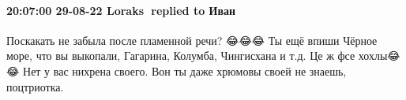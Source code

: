  
 
 
 
 

\paragraph{20:07:00 29-08-22 Loraks 🎀replied to Иван}

Поскакать не забыла после пламенной речи? 😂😂😂
Ты ещё впиши Чёрное море, что вы выкопали, Гагарина, Колумба, Чингисхана и т.д.
Це ж фсе хохлы😂😂
Нет у вас нихрена своего. Вон ты даже хрюмовы своей не знаешь, поцтриотка.
